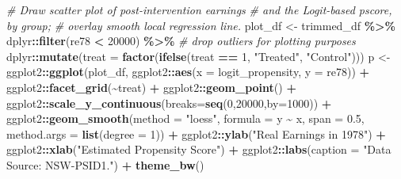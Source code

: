 \documentclass[
]{article}
\newenvironment{Shaded}{\begin{snugshade}}{\end{snugshade}}
\newcommand{\AttributeTok}[1]{\textcolor[rgb]{0.13,0.29,0.53}{#1}}
\newcommand{\CommentTok}[1]{\textcolor[rgb]{0.56,0.35,0.01}{\textit{#1}}}
\newcommand{\DecValTok}[1]{\textcolor[rgb]{0.00,0.00,0.81}{#1}}
\newcommand{\FloatTok}[1]{\textcolor[rgb]{0.00,0.00,0.81}{#1}}
\newcommand{\FunctionTok}[1]{\textcolor[rgb]{0.13,0.29,0.53}{\textbf{#1}}}
\newcommand{\NormalTok}[1]{#1}
\newcommand{\OtherTok}[1]{\textcolor[rgb]{0.56,0.35,0.01}{#1}}
\newcommand{\SpecialCharTok}[1]{\textcolor[rgb]{0.81,0.36,0.00}{\textbf{#1}}}
\newcommand{\StringTok}[1]{\textcolor[rgb]{0.31,0.60,0.02}{#1}}
\begin{document}
\begin{enumerate}
\begin{Shaded}
\begin{Highlighting}[]
\CommentTok{\# Draw scatter plot of post{-}intervention earnings}
\CommentTok{\# and the Logit{-}based pscore, by group;}
\CommentTok{\# overlay smooth local regression line.}
\NormalTok{plot\_df }\OtherTok{\textless{}{-}}\NormalTok{ trimmed\_df }\SpecialCharTok{\%\textgreater{}\%}
\NormalTok{dplyr}\SpecialCharTok{::}\FunctionTok{filter}\NormalTok{(re78 }\SpecialCharTok{\textless{}} \DecValTok{20000}\NormalTok{) }\SpecialCharTok{\%\textgreater{}\%} \CommentTok{\# drop outliers for plotting purposes}
\NormalTok{dplyr}\SpecialCharTok{::}\FunctionTok{mutate}\NormalTok{(}\AttributeTok{treat =} \FunctionTok{factor}\NormalTok{(}\FunctionTok{ifelse}\NormalTok{(treat }\SpecialCharTok{==} \DecValTok{1}\NormalTok{, }\StringTok{"Treated"}\NormalTok{, }\StringTok{"Control"}\NormalTok{)))}
\NormalTok{p }\OtherTok{\textless{}{-}}\NormalTok{ ggplot2}\SpecialCharTok{::}\FunctionTok{ggplot}\NormalTok{(plot\_df, ggplot2}\SpecialCharTok{::}\FunctionTok{aes}\NormalTok{(}\AttributeTok{x =}\NormalTok{ logit\_propensity, }\AttributeTok{y =}\NormalTok{ re78)) }\SpecialCharTok{+}
\NormalTok{ggplot2}\SpecialCharTok{::}\FunctionTok{facet\_grid}\NormalTok{(}\SpecialCharTok{\textasciitilde{}}\NormalTok{treat) }\SpecialCharTok{+}
\NormalTok{ggplot2}\SpecialCharTok{::}\FunctionTok{geom\_point}\NormalTok{() }\SpecialCharTok{+} 
\NormalTok{ggplot2}\SpecialCharTok{::}\FunctionTok{scale\_y\_continuous}\NormalTok{(}\AttributeTok{breaks=}\FunctionTok{seq}\NormalTok{(}\DecValTok{0}\NormalTok{,}\DecValTok{20000}\NormalTok{,}\AttributeTok{by=}\DecValTok{1000}\NormalTok{)) }\SpecialCharTok{+}
\NormalTok{ggplot2}\SpecialCharTok{::}\FunctionTok{geom\_smooth}\NormalTok{(}\AttributeTok{method =} \StringTok{"loess"}\NormalTok{, }\AttributeTok{formula =}\NormalTok{ y }\SpecialCharTok{\textasciitilde{}}\NormalTok{ x, }\AttributeTok{span =} \FloatTok{0.5}\NormalTok{, }
                                        \AttributeTok{method.args =} \FunctionTok{list}\NormalTok{(}\AttributeTok{degree =} \DecValTok{1}\NormalTok{)) }\SpecialCharTok{+}
\NormalTok{ggplot2}\SpecialCharTok{::}\FunctionTok{ylab}\NormalTok{(}\StringTok{"Real Earnings in 1978"}\NormalTok{) }\SpecialCharTok{+}
\NormalTok{ggplot2}\SpecialCharTok{::}\FunctionTok{xlab}\NormalTok{(}\StringTok{"Estimated Propensity Score"}\NormalTok{) }\SpecialCharTok{+}
\NormalTok{ggplot2}\SpecialCharTok{::}\FunctionTok{labs}\NormalTok{(}\AttributeTok{caption =} \StringTok{"Data Source: NSW{-}PSID1."}\NormalTok{) }\SpecialCharTok{+}
\FunctionTok{theme\_bw}\NormalTok{()}


\end{Highlighting}
\end{Shaded}
\end{enumerate}
\end{document}
